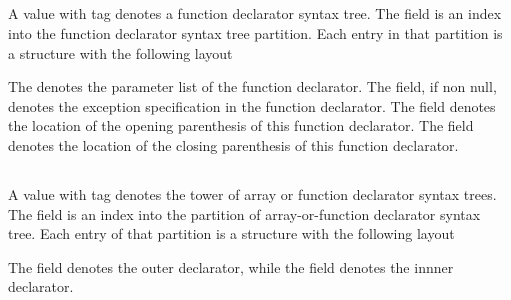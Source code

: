 
\subsection{}
\label{sec:ifc:SyntaxSort:FunctionDeclarator}


A  value with tag  denotes a function declarator syntax tree.
The  field is an index into the function declarator syntax tree partition.
Each entry in that partition is a structure with the following layout
%
\begin{figure}[H]
	\centering
	\label{fig:ifc:SyntaxSort:FunctionDeclarator}
\end{figure}
%
The  denotes the parameter list of the function declarator.
The  field, if non null, denotes the exception specification in the function declarator.
The  field denotes the location of the opening parenthesis of this function declarator.
The  field denotes the location of the closing parenthesis of this function declarator.


\subsection{}
\label{sec:ifc:SyntaxSort:ArrayOrFunctionDeclarator}

A  value with tag  denotes the tower of array or function declarator syntax trees.
The  field is an index into the partition of array-or-function declarator syntax tree.
Each entry of that partition is a structure with the following layout
%
\begin{figure}[H]
	\centering
	\label{fig:ifc:SyntaxSort:ArrayOrFunctionDeclarator}
\end{figure}
%
The  field denotes the outer declarator, while the  field
denotes the innner declarator.

